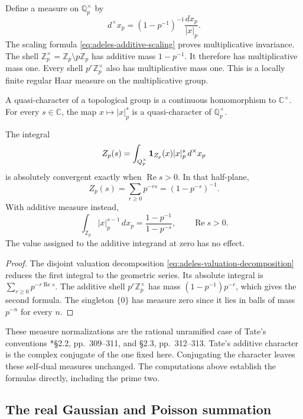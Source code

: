 Define a measure on \(\mathbb Q_p^\times\) by
\begin{equation}
 d^{\times} x_p=(1-p^{-1})^{-1}\frac{dx_p}{|x|_p}.
 \label{eq:adeles-multiplicative-measure}
\end{equation}
The scaling formula \eqref{eq:adeles-additive-scaling} proves multiplicative
invariance. The shell \(\mathbb Z_p^\times=\mathbb Z_p\setminus p\mathbb Z_p\) has additive
mass \(1-p^{-1}\). It therefore has multiplicative mass one.
Every shell \(p^r\mathbb Z_p^\times\) also has multiplicative mass one.
This is a locally finite regular Haar measure on the multiplicative group.

A quasi-character of a topological group is a continuous homomorphism to
\(\mathbb C^\times\). For every \(s\in\mathbb C\), the map
\(x\mapsto|x|_p^s\) is a quasi-character of \(\mathbb Q_p^\times\).

\begin{proposition}
\label{prop:adeles-finite-factor}
The integral
\[
 Z_p(s)=\int_{Q_p^\times}\mathbf 1_{Z_p}(x)|x|_p^s\,d^{\times} x_p
\]
is absolutely convergent exactly when \(\operatorname{Re}s>0\). In that
half-plane,
\[
 Z_p(s)=\sum_{r\geq0}p^{-rs}=(1-p^{-s})^{-1}.
\]
With additive measure instead,
\[
 \int_{\mathbb Z_p}|x|_p^{s-1}\,dx_p
 =\frac{1-p^{-1}}{1-p^{-s}},\qquad\operatorname{Re}s>0.
\]
The value assigned to the additive integrand at zero has no effect.
\end{proposition}

\begin{proof}
The disjoint valuation decomposition
\eqref{eq:adeles-valuation-decomposition} reduces the first integral to the
geometric series. Its absolute integral is \(\sum_{r\geq0}p^{-r\operatorname{Re}s}\).
The additive shell \(p^r\mathbb Z_p^\times\) has mass
\((1-p^{-1})p^{-r}\), which gives the second formula.
The singleton \(\{0\}\) has measure zero since it lies in balls of mass
\(p^{-n}\) for every \(n\).
\end{proof}

These measure normalizations are the rational unramified case of Tate's
conventions \cite{Tate1950}*{\S2.2, pp.~309--311, and \S2.3, pp.~312--313}.
Tate's additive character is the complex conjugate of the one fixed here.
Conjugating the character leaves these self-dual measures unchanged.
The computations above establish the formulas directly, including the prime two.

\subsection{The real Gaussian and Poisson summation}
\label{sec:adeles-real-poisson}

